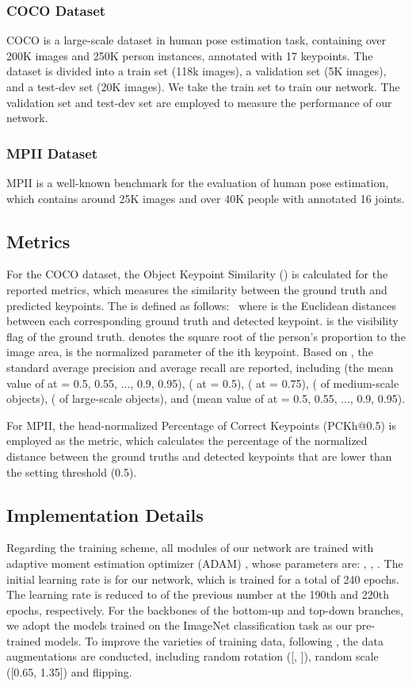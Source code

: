 \documentclass[runningheads]{llncs}
\begin{document}
\subsubsection{COCO Dataset}
COCO is a large-scale dataset in human pose estimation task, containing over 200K images and 250K person instances, annotated with 17 keypoints. The dataset is divided into a train set (118k images), a validation set (5K images), and a test-dev set (20K images). We take the train set to train our network. The validation set and test-dev set are employed to measure the performance of our network.

\subsubsection{MPII Dataset} 
MPII is a well-known benchmark for the evaluation of human pose estimation, which contains around 25K images and over 40K people with annotated 16 joints.

\subsection{Metrics}
For the COCO dataset, the Object Keypoint Similarity () is calculated for the reported metrics, which measures the similarity between the ground truth and predicted keypoints. The  is defined as follows:
\
where  is the Euclidean distances between each corresponding ground truth and detected keypoint.  is the visibility flag of the ground truth.  denotes the square root of the person's proportion to the image area,  is the normalized parameter of the ith keypoint. Based on , the standard average precision and average recall are reported, including  (the mean value of  at  = 0.5, 0.55, ..., 0.9, 0.95),  ( at  = 0.5),  ( at  = 0.75),  ( of medium-scale objects),  ( of large-scale objects), and  (mean value of  at  = 0.5, 0.55, ..., 0.9, 0.95).

For MPII, the head-normalized Percentage of Correct Keypoints (PCKh@0.5) \cite{MPII20142d} is employed as the metric, which calculates the percentage of the normalized distance between the ground truths and detected keypoints that are lower than the setting threshold (0.5).

\subsection{Implementation Details}
\label{sec:Implementation}
Regarding the training scheme, all modules of our network are trained with adaptive moment estimation optimizer (ADAM) \cite{2014Adam}, whose parameters are: , , . The initial learning rate is  for our network, which is trained for a total of 240 epochs. The learning rate is reduced to  of the previous number at the 190th and 220th epochs, respectively. For the backbones of the bottom-up and top-down branches, we adopt the models trained on the ImageNet classification task as our pre-trained models. To improve the varieties of training data, following \cite{HRNet2019}, the data augmentations are conducted, including random rotation ([, ]), random scale ([0.65, 1.35]) and flipping.
\end{document}
